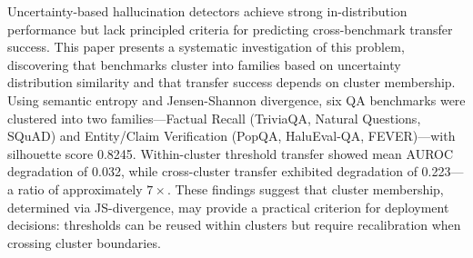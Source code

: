 
Uncertainty-based hallucination detectors achieve strong in-distribution performance but lack principled criteria for predicting cross-benchmark transfer success. This paper presents a systematic investigation of this problem, discovering that benchmarks cluster into families based on uncertainty distribution similarity and that transfer success depends on cluster membership. Using semantic entropy and Jensen-Shannon divergence, six QA benchmarks were clustered into two families---Factual Recall (TriviaQA, Natural Questions, SQuAD) and Entity/Claim Verification (PopQA, HaluEval-QA, FEVER)---with silhouette score 0.8245. Within-cluster threshold transfer showed mean AUROC degradation of 0.032, while cross-cluster transfer exhibited degradation of 0.223---a ratio of approximately $7\times$. These findings suggest that cluster membership, determined via JS-divergence, may provide a practical criterion for deployment decisions: thresholds can be reused within clusters but require recalibration when crossing cluster boundaries.

